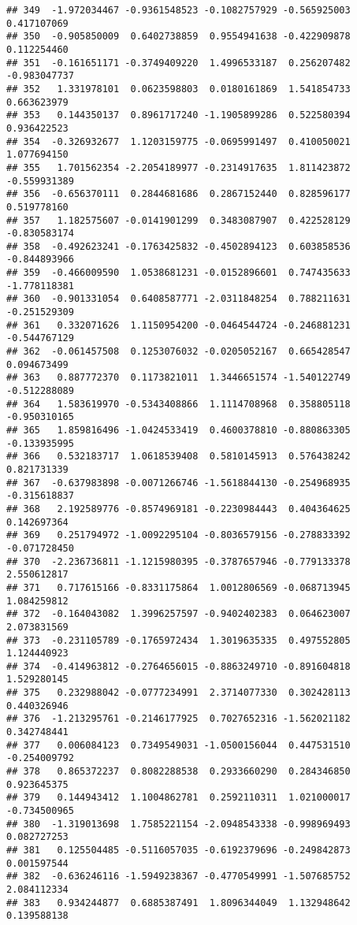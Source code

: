\documentclass[
]{article}
\begin{document}
\begin{verbatim}
## 349  -1.972034467 -0.9361548523 -0.1082757929 -0.565925003  0.417107069
## 350  -0.905850009  0.6402738859  0.9554941638 -0.422909878  0.112254460
## 351  -0.161651171 -0.3749409220  1.4996533187  0.256207482 -0.983047737
## 352   1.331978101  0.0623598803  0.0180161869  1.541854733  0.663623979
## 353   0.144350137  0.8961717240 -1.1905899286  0.522580394  0.936422523
## 354  -0.326932677  1.1203159775 -0.0695991497  0.410050021  1.077694150
## 355   1.701562354 -2.2054189977 -0.2314917635  1.811423872 -0.559931389
## 356  -0.656370111  0.2844681686  0.2867152440  0.828596177  0.519778160
## 357   1.182575607 -0.0141901299  0.3483087907  0.422528129 -0.830583174
## 358  -0.492623241 -0.1763425832 -0.4502894123  0.603858536 -0.844893966
## 359  -0.466009590  1.0538681231 -0.0152896601  0.747435633 -1.778118381
## 360  -0.901331054  0.6408587771 -2.0311848254  0.788211631 -0.251529309
## 361   0.332071626  1.1150954200 -0.0464544724 -0.246881231 -0.544767129
## 362  -0.061457508  0.1253076032 -0.0205052167  0.665428547  0.094673499
## 363   0.887772370  0.1173821011  1.3446651574 -1.540122749 -0.512288089
## 364   1.583619970 -0.5343408866  1.1114708968  0.358805118 -0.950310165
## 365   1.859816496 -1.0424533419  0.4600378810 -0.880863305 -0.133935995
## 366   0.532183717  1.0618539408  0.5810145913  0.576438242  0.821731339
## 367  -0.637983898 -0.0071266746 -1.5618844130 -0.254968935 -0.315618837
## 368   2.192589776 -0.8574969181 -0.2230984443  0.404364625  0.142697364
## 369   0.251794972 -1.0092295104 -0.8036579156 -0.278833392 -0.071728450
## 370  -2.236736811 -1.1215980395 -0.3787657946 -0.779133378  2.550612817
## 371   0.717615166 -0.8331175864  1.0012806569 -0.068713945  1.084259812
## 372  -0.164043082  1.3996257597 -0.9402402383  0.064623007  2.073831569
## 373  -0.231105789 -0.1765972434  1.3019635335  0.497552805  1.124440923
## 374  -0.414963812 -0.2764656015 -0.8863249710 -0.891604818  1.529280145
## 375   0.232988042 -0.0777234991  2.3714077330  0.302428113  0.440326946
## 376  -1.213295761 -0.2146177925  0.7027652316 -1.562021182  0.342748441
## 377   0.006084123  0.7349549031 -1.0500156044  0.447531510 -0.254009792
## 378   0.865372237  0.8082288538  0.2933660290  0.284346850  0.923645375
## 379   0.144943412  1.1004862781  0.2592110311  1.021000017 -0.734500965
## 380  -1.319013698  1.7585221154 -2.0948543338 -0.998969493  0.082727253
## 381   0.125504485 -0.5116057035 -0.6192379696 -0.249842873  0.001597544
## 382  -0.636246116 -1.5949238367 -0.4770549991 -1.507685752  2.084112334
## 383   0.934244877  0.6885387491  1.8096344049  1.132948642  0.139588138

\end{verbatim}
\end{document}
